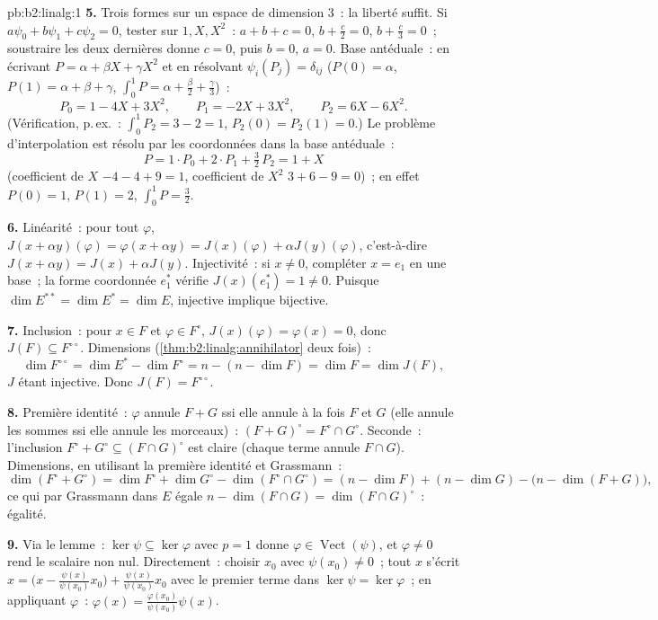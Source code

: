 \begin{solution}{pb:b2:linalg:1}
\textbf{5.} Trois formes sur un espace de dimension $3$~: la liberté
suffit. Si $a\psi_0 + b\psi_1 + c\psi_2 = 0$, tester sur $1, X,
X^2$~: $a + b + c = 0$, $b + \frac c2 = 0$, $b + \frac c3 = 0$~;
soustraire les deux dernières donne $c = 0$, puis $b = 0$, $a = 0$.
Base antéduale~: en écrivant $P = \alpha + \beta X + \gamma X^2$ et en
résolvant $\psi_i(P_j) = \delta_{ij}$ ($P(0) = \alpha$, $P(1) =
\alpha + \beta + \gamma$, $\int_0^1 P = \alpha + \frac\beta2 +
\frac\gamma3$)~:
\[
P_0 = 1 - 4X + 3X^2, \qquad
P_1 = -2X + 3X^2, \qquad
P_2 = 6X - 6X^2 .
\]
(Vérification, p.\,ex.~: $\int_0^1 P_2 = 3 - 2 = 1$, $P_2(0) = P_2(1) = 0$.)
Le problème d'interpolation est résolu par les coordonnées dans la
base antéduale~:
\[
P = 1\cdot P_0 + 2\cdot P_1 + \tfrac32\, P_2 = 1 + X
\]
(coefficient de $X$ $-4 - 4 + 9 = 1$, coefficient de $X^2$ $3 + 6 - 9 =
0$)~; en effet $P(0) = 1$, $P(1) = 2$, $\int_0^1 P = \frac32$.

\textbf{6.} Linéarité~: pour tout $\varphi$, $J(x + \alpha
y)(\varphi) = \varphi(x + \alpha y) = J(x)(\varphi) + \alpha
J(y)(\varphi)$, c'est-à-dire $J(x + \alpha y) = J(x) + \alpha J(y)$.
Injectivité~: si $x \neq 0$, compléter $x = e_1$ en une base~; la forme
coordonnée $e_1^*$ vérifie $J(x)(e_1^*) = 1 \neq 0$. Puisque $\dim E^{**} = \dim E^* = \dim
E$, injective implique bijective.

\textbf{7.} Inclusion~: pour $x \in F$ et $\varphi \in F^\circ$,
$J(x)(\varphi) = \varphi(x) = 0$, donc $J(F) \subseteq
F^{\circ\circ}$. Dimensions
(\cref{thm:b2:linalg:annihilator} deux fois)~:
\[
\dim F^{\circ\circ} = \dim E^* - \dim F^\circ
= n - (n - \dim F) = \dim F = \dim J(F),
\]
$J$ étant injective. Donc $J(F) = F^{\circ\circ}$.

\textbf{8.} Première identité~: $\varphi$ annule $F + G$ ssi elle annule
à la fois $F$ et $G$ (elle annule les sommes ssi elle annule les
morceaux)~: $(F+G)^\circ = F^\circ \cap G^\circ$. Seconde~: l'inclusion
$F^\circ + G^\circ \subseteq (F \cap G)^\circ$ est claire (chaque
terme annule $F \cap G$). Dimensions, en utilisant la première identité
et Grassmann~:
\[
\dim(F^\circ + G^\circ) = \dim F^\circ + \dim G^\circ -
\dim(F^\circ \cap G^\circ)
= (n - \dim F) + (n - \dim G) - \bigl(n - \dim(F +
G)\bigr),
\]
ce qui par Grassmann dans $E$ égale $n - \dim(F \cap G) = \dim(F
\cap G)^\circ$~: égalité.

\textbf{9.} Via le lemme~: $\ker\psi \subseteq \ker\varphi$ avec
$p = 1$ donne $\varphi \in \operatorname{Vect}(\psi)$, et
$\varphi \neq 0$ rend le scalaire non nul. Directement~: choisir $x_0$
avec $\psi(x_0) \neq 0$~; tout $x$ s'écrit $x = \bigl(x -
\frac{\psi(x)}{\psi(x_0)}x_0\bigr) + \frac{\psi(x)}{\psi(x_0)}
x_0$ avec le premier terme dans $\ker\psi = \ker\varphi$~; en appliquant
$\varphi$~: $\varphi(x) = \frac{\varphi(x_0)}{\psi(x_0)}\psi(x)$.


\end{solution}
